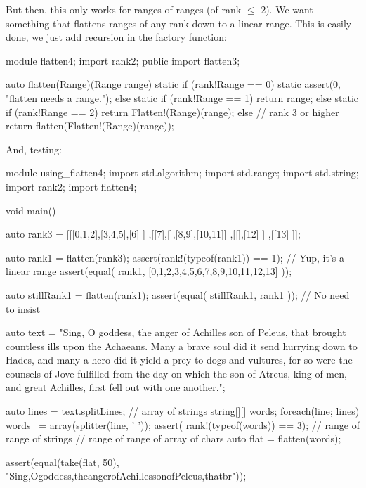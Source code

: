 But then, this only works for ranges of ranges (of rank $\leq$ 2). We want something that flattens ranges of any rank down to a linear range. This is easily done, we just add recursion in the factory function:

\begin{dcode}
module flatten4;
import rank2;
public import flatten3;

auto flatten(Range)(Range range)
{ 
    static if      (rank!Range == 0)
        static assert(0, "flatten needs a range.");
    else static if (rank!Range == 1)
        return range;
    else static if (rank!Range == 2)
        return Flatten!(Range)(range);
    else         // rank 3 or higher
        return flatten(Flatten!(Range)(range));
}
\end{dcode}

And, testing:

\begin{dcode}
module using_flatten4;
import std.algorithm;
import std.range;
import std.string;
import rank2;
import flatten4;

void main()
{
    auto rank3 = [[[0,1,2],[3,4,5],[6] ]
                 ,[[7],[],[8,9],[10,11]]
                 ,[[],[12]             ]
                 ,[[13]                ]];

    auto rank1 = flatten(rank3);
    assert(rank!(typeof(rank1)) == 1); // Yup, it's a linear range
    assert(equal( rank1, [0,1,2,3,4,5,6,7,8,9,10,11,12,13] ));

    auto stillRank1 = flatten(rank1);
    assert(equal( stillRank1, rank1 )); // No need to insist

    auto text =
   "Sing, O goddess, the anger of Achilles son of Peleus,
    that brought countless ills upon the Achaeans.
    Many a brave soul did it send hurrying down to Hades,
    and many a hero did it yield a prey to dogs and vultures,
    for so were the counsels of Jove fulfilled
    from the day on which the son of Atreus, king of men,
    and great Achilles, first fell out with one another.";

    auto lines = text.splitLines;   // array of strings
    string[][] words;
    foreach(line; lines) words ~= array(splitter(line, ' '));
    assert( rank!(typeof(words)) == 3); // range of range of strings
                                        // range of range of array of chars
    auto flat = flatten(words);

    assert(equal(take(flat, 50), 
             "Sing,Ogoddess,theangerofAchillessonofPeleus,thatbr"));
}
\end{dcode}

